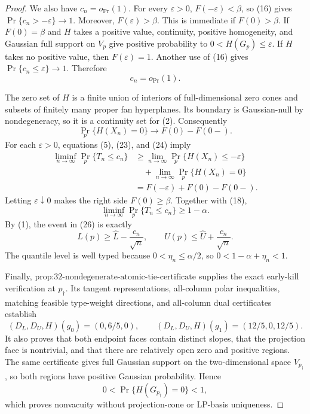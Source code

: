 \documentclass{article}
\begin{document}
\begin{proof}
We also have \(c_n=o_{\Pr}(1)\). For every \(\varepsilon>0\), \(F(-\varepsilon)<\beta\), so (16) gives \(\Pr\{c_n> -\varepsilon\}\to1\). Moreover, \(F(\varepsilon)>\beta\). This is immediate if \(F(0)>\beta\). If \(F(0)=\beta\) and \(H\) takes a positive value, continuity, positive homogeneity, and Gaussian full support on \(V_p\) give positive probability to \(0<H(G_p)\leq\varepsilon\). If \(H\) takes no positive value, then \(F(\varepsilon)=1\). Another use of (16) gives \(\Pr\{c_n\leq\varepsilon\}\to1\). Therefore
\[
c_n=o_{\Pr}(1).
\tag{24}
\]

The zero set of \(H\) is a finite union of interiors of full-dimensional zero cones and subsets of finitely many proper fan hyperplanes. Its boundary is Gaussian-null by nondegeneracy, so it is a continuity set for (2). Consequently
\[
\Pr_p\{H(X_n)=0\}\longrightarrow F(0)-F(0-).
\tag{25}
\]
For each \(\varepsilon>0\), equations (5), (23), and (24) imply
\[
\begin{aligned}
\liminf_{n\to\infty}\Pr_p\{T_n\leq c_n\}
&\geq \lim_{n\to\infty}\Pr_p\{H(X_n)\leq-\varepsilon\}\\
&\quad+\lim_{n\to\infty}\Pr_p\{H(X_n)=0\}\\
&=F(-\varepsilon)+F(0)-F(0-).
\end{aligned}
\]
Letting \(\varepsilon\downarrow0\) makes the right side \(F(0)\geq\beta\). Together with (18),
\[
\liminf_{n\to\infty}\Pr_p\{T_n\leq c_n\}\geq1-\alpha.
\tag{26}
\]
By (1), the event in (26) is exactly
\[
L(p)\geq\widehat L-\frac{c_n}{\sqrt n},
\qquad
U(p)\leq\widehat U+\frac{c_n}{\sqrt n}.
\]
The quantile level is well typed because \(0<\eta_n\leq\alpha/2\), so \(0<1-\alpha+\eta_n<1\).

Finally, \(\text{prop:32-nondegenerate-atomic-tie-certificate}\) supplies the exact early-kill verification at \(p_\dagger\). Its tangent representations, all-column polar inequalities, matching feasible type-weight directions, and all-column dual certificates establish
\[
(D_L,D_U,H)(g_0)=(0,6/5,0),
\qquad
(D_L,D_U,H)(g_1)=(12/5,0,12/5).
\]
It also proves that both endpoint faces contain distinct slopes, that the projection face is nontrivial, and that there are relatively open zero and positive regions. The same certificate gives full Gaussian support on the two-dimensional space \(V_{p_\dagger}\), so both regions have positive Gaussian probability. Hence
\[
0<\Pr\{H(G_{p_\dagger})=0\}<1,
\]
which proves nonvacuity without projection-cone or LP-basis uniqueness.
\end{proof}
\end{document}
